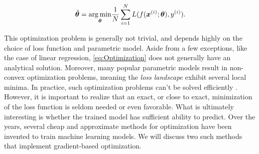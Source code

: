 \begin{equation}\label{eq:Optimization}
    \hat{\boldsymbol{\theta}} = \underset{\boldsymbol{\theta}}{\operatorname*{arg\,min}} \frac{1}{N}\sum_{i=1}^{N} L(f(\boldsymbol{x}^{(i)}; \boldsymbol{\theta}) , y^{(i)}).
\end{equation}

This optimization problem is generally not trivial, and depends highly on the choice of loss function and parametric model. Aside from a few exceptions, like the case of linear regression, \cref{eq:Optimization} does not generally have an analytical solution. Moreover, many popular parametric models result in non-convex optimization problems, meaning the \emph{loss landscape} exhibit several local minima. In practice, such optimization problems can't be solved efficiently \cite{Vava:book}. However, it is important to realize that an exact, or close to exact, minimization of the loss function is seldom needed or even favorable. What is ultimately interesting is whether the trained model has sufficient ability to predict. Over the years, several cheap and approximate methods for optimization have been invented to train machine learning models. We will discuss two such methods that implement gradient-based optimization. 




